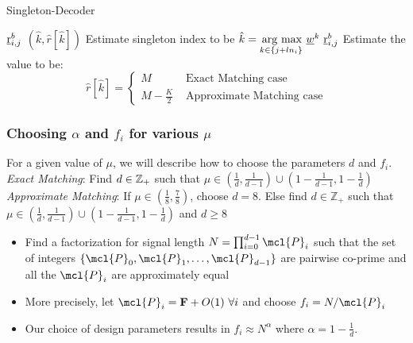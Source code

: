 \begin{enumerate}
\begin{algorithm}[h!]
\caption{Singleton-Decoder}
\label{Algo:SingletonDecoder}
\begin{algorithmic}
 $\underline{\mathrm{r}}^b_{i,j}$
\vspace{\gap}
 $(\hat{k},\hat{r}[\hat{k}])$
\vspace{\gap}
\State Estimate singleton index to be $ \hat{k} = \underset{k\in\{j+l n_i\}}{\operatorname*{\,arg\ max}}\  \underline{w}^{k} ~ \underline{\mathrm{r}}^{b}_{i,j}$
\vspace{\gap}
  \State Estimate the value to be:$$ \hat{r}[\hat{k}]=
   \begin{cases}
   M & \text{ Exact Matching case}\\
  M-\frac{K}{2} & \text{ Approximate Matching case}
  \end{cases}
  $$
\end{algorithmic}
\end{algorithm}

\subsubsection{Choosing $\alpha$ and $f_i$ for various $\mu$}
\label{subsec:DesignParameters}
For a given value of $\mu$, we will describe how to choose the parameters $d$ and $f_i$.\\
{\it Exact Matching}: Find $d\in \mathbb{Z}_+$ such that $\mu\in(\frac{1}{d},\frac{1}{d-1})\cup(1-\frac{1}{d-1},1-\frac{1}{d})$\\
{\it Approximate Matching}: If $\mu\in(\frac{1}{8},\frac{7}{8})$, choose $d=8$. Else find $d\in\mathbb{Z}_+$ such that $\mu\in(\frac{1}{d},\frac{1}{d-1})\cup(1-\frac{1}{d-1},1-\frac{1}{d})$ and $d\geq 8$ \\

\begin{itemize}
\item Find a factorization for signal length $N=\prod_{i=0}^{d-1} \mcl{P}_i$ such that the set of integers $\{\mcl{P}_0,\mcl{P}_1,\ldots,\mcl{P}_{d-1}\}$ are pairwise co-prime and all the $\mcl{P}_i$ are approximately equal
\item More precisely, let $\mcl{P}_i=\mathbf{F}+O(1) ~\forall i$ and choose $f_i=N/\mcl{P}_i$
\item Our choice of design parameters results in $f_i\approx N^{\alpha}$ where $\alpha=1-\frac{1}{d}$.
\end{itemize} 



\end{enumerate}
